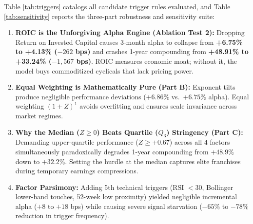 \documentclass[10pt,twocolumn]{article}
\begin{document}
Table \ref{tab:triggers} catalogs all candidate trigger rules evaluated, and Table \ref{tab:sensitivity} reports the three-part robustness and sensitivity suite:
\begin{enumerate}
    \item \textbf{ROIC is the Unforgiving Alpha Engine (Ablation Test 2):} Dropping Return on Invested Capital causes 3-month alpha to collapse from \textbf{+6.75\% to +4.13\% ($-262$ bps)} and crashes 1-year compounding from \textbf{+48.91\% to +33.24\% ($-1,567$ bps)}. ROIC measures economic moat; without it, the model buys commoditized cyclicals that lack pricing power.
    \item \textbf{Equal Weighting is Mathematically Pure (Part B):} Exponent tilts produce negligible performance deviations ($+6.86\%$ vs.\ $+6.75\%$ alpha). Equal weighting $(1+Z)^1$ avoids overfitting and ensures scale invariance across market regimes.
    \item \textbf{Why the Median ($Z \ge 0$) Beats Quartile ($Q_3$) Stringency (Part C):} Demanding upper-quartile performance ($Z \ge +0.67$) across all 4 factors simultaneously paradoxically degrades 1-year compounding from $+48.9\%$ down to $+32.2\%$. Setting the hurdle at the median captures elite franchises during temporary earnings compressions.
    \item \textbf{Factor Parsimony:} Adding 5th technical triggers (RSI $< 30$, Bollinger lower-band touches, 52-week low proximity) yielded negligible incremental alpha ($+8$ to $+18$ bps) while causing severe signal starvation ($-65\%$ to $-78\%$ reduction in trigger frequency).
\end{enumerate}
\end{document}

